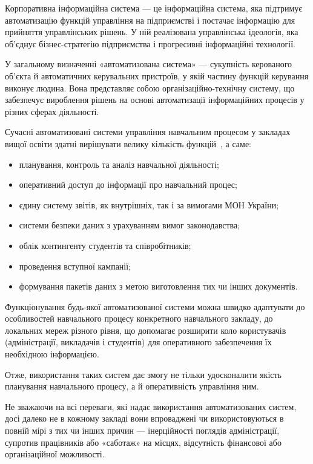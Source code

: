 \label{subsubs:KIS}

Корпоративна інформаційна система — це інформаційна система, яка підтримує автоматизацію функцій управління на підприємстві і постачає інформацію для прийняття управлінських рішень. У ній реалізована управлінська ідеологія, яка об'єднує бізнес-стратегію підприємства і прогресивні інформаційні технології.

У загальному визначенні «автоматизована система» — сукупність керованого об'єкта й автоматичних керувальних пристроїв, у якій частину функцій керування виконує людина. Вона представляє собою організаційно-технічну систему, що забезпечує вироблення рішень на основі автоматизації інформаційних процесів у різних сферах діяльності. 

Сучасні автоматизовані системи управління навчальним процесом у  закладах вищої освіти здатні вирішувати велику кількість функцій~\cite{співаковський2014побудова}, а саме:
\begin{itemize}
	\item планування, контроль та аналіз навчальної діяльності;
	\item оперативний доступ до інформації про навчальний процес;
	\item єдину систему звітів, як внутрішніх, так і за вимогами МОН України;
	\item системи безпеки даних з урахуванням вимог законодавства;
	\item облік контингенту студентів та співробітників;
	\item проведення вступної кампанії;
	\item формування пакетів даних з метою виготовлення тих чи інших документів.
\end{itemize}

Функціонування будь-якої автоматизованої системи можна швидко адаптувати до особливостей навчального процесу конкретного навчального закладу, до локальних мереж різного рівня, що допомагає розширити коло користувачів (адміністрації, викладачів і студентів) для оперативного забезпечення їх необхідною інформацією. 

Отже, використання таких систем дає змогу не тільки удосконалити якість планування навчального процесу, а й оперативність управління ним.

Не зважаючи на всі переваги, які надає використання автоматизованих систем, досі далеко не в кожному закладі вони впроваджені чи використовуються в повній мірі з тих чи інших причин — інерційності поглядів адміністрації, супротив працівників або «саботаж» на місцях, відсутність фінансової або організаційної можливості.

